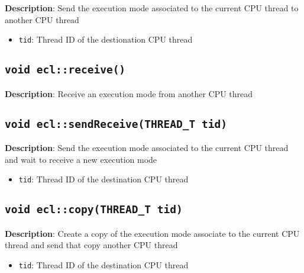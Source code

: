 \textbf{Description}: Send the execution mode associated to the current CPU thread to another CPU thread
\begin{itemize}
  \item \texttt{tid}: Thread ID of the destionation CPU thread
\end{itemize}

\subsection{\texttt{void ecl::receive()}}

\textbf{Description}: Receive an execution mode from another CPU thread

\subsection{\texttt{void ecl::sendReceive(THREAD\_T tid)}}

\textbf{Description}: Send the execution mode associated to the current CPU thread and wait to receive a new execution mode
\begin{itemize}
  \item \texttt{tid}: Thread ID of the destination CPU thread
\end{itemize}

\subsection{\texttt{void ecl::copy(THREAD\_T tid)}}

\textbf{Description}: Create a copy of the execution mode associate to the current CPU thread and send that copy another CPU thread
\begin{itemize}
  \item \texttt{tid}: Thread ID of the destination CPU thread
\end{itemize}

